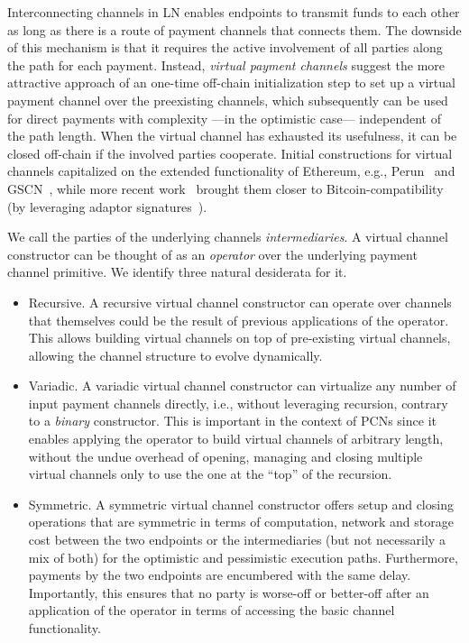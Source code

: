 Interconnecting channels in LN enables endpoints to transmit funds
to each other as long as there is a route of payment channels that connects
them. The downside of this mechanism is that it requires the active involvement
of all parties along the path for each payment. Instead, \emph{virtual payment
channels} suggest the more attractive approach of an one-time off-chain
initialization step to set up a virtual payment channel over the preexisting
channels, which subsequently can
be used for direct payments with complexity ---in the optimistic case---
independent of the path length. When the virtual channel has exhausted
its usefulness, it can be closed off-chain if the involved parties cooperate.
Initial constructions for virtual channels capitalized on the extended functionality of Ethereum, e.g.,
Perun~\cite{perun} and GSCN~\cite{DBLP:conf/ccs/DziembowskiFH18}, while more
recent work~\cite{9519487} brought them closer to
Bitcoin-compatibility (by leveraging adaptor
signatures~\cite{DBLP:journals/iacr/AumayrEEFHMMR20}).

We call the parties of the underlying channels \emph{intermediaries}.
A virtual channel constructor can be thought of as an \emph{operator} over the
underlying payment channel primitive. We identify three natural
desiderata for it.

\begin{itemize}
\item Recursive. A recursive virtual channel constructor can operate over
channels that themselves could be the result of previous applications of the
operator. This allows building
virtual channels on top of pre-existing virtual channels, allowing the channel
structure to evolve dynamically.
\item Variadic. A variadic virtual channel constructor can virtualize any number
of input payment channels directly, i.e., without leveraging recursion, contrary to a \emph{binary} constructor. This is
important in the context of PCNs since it enables applying the operator to build
virtual channels of arbitrary length, without the undue overhead of opening,
managing and closing multiple virtual channels only to use the one at the
``top'' of the recursion.
\item Symmetric. A symmetric virtual channel constructor offers setup and
closing operations that are symmetric in terms of computation, network and storage cost between the two
endpoints or the intermediaries (but not necessarily a mix of both) for the
optimistic and pessimistic execution paths. Furthermore, payments by the two
endpoints are encumbered with the same delay. Importantly, this ensures that no
party is worse-off or better-off after an application of the operator in terms
of accessing the basic channel functionality.
\end{itemize}

